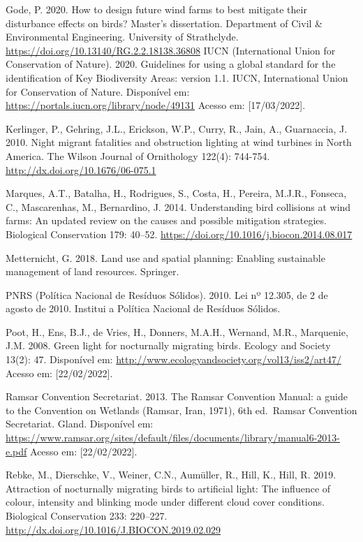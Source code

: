 \documentclass[
  oneside]{scrbook}
\begin{document}
Gode, P. 2020. How to design future wind farms to best mitigate their disturbance effects on birds? Master's dissertation. Department of Civil \& Environmental Engineering. University of Strathclyde. \url{https://doi.org/10.13140/RG.2.2.18138.36808}
IUCN (International Union for Conservation of Nature). 2020. Guidelines for using a global standard for the identification of Key Biodiversity Areas: version 1.1. IUCN, International Union for Conservation of Nature. Disponível em: \url{https://portals.iucn.org/library/node/49131} Acesso em: {[}17/03/2022{]}.

Kerlinger, P., Gehring, J.L., Erickson, W.P., Curry, R., Jain, A., Guarnaccia, J. 2010. Night migrant fatalities and obstruction lighting at wind turbines in North America. The Wilson Journal of Ornithology 122(4): 744-754. \url{http://dx.doi.org/10.1676/06-075.1}

Marques, A.T., Batalha, H., Rodrigues, S., Costa, H., Pereira, M.J.R., Fonseca, C., Mascarenhas, M., Bernardino, J. 2014. Understanding bird collisions at wind farms: An updated review on the causes and possible mitigation strategies. Biological Conservation 179: 40--52. \url{https://doi.org/10.1016/j.biocon.2014.08.017}

Metternicht, G. 2018. Land use and spatial planning: Enabling sustainable management of land resources. Springer.

PNRS (Política Nacional de Resíduos Sólidos). 2010. Lei nº 12.305, de 2 de agosto de 2010. Institui a Política Nacional de Resíduos Sólidos.

Poot, H., Ens, B.J., de Vries, H., Donners, M.A.H., Wernand, M.R., Marquenie, J.M. 2008. Green light for nocturnally migrating birds. Ecology and Society 13(2): 47. Disponível em: \url{http://www.ecologyandsociety.org/vol13/iss2/art47/} Acesso em: {[}22/02/2022{]}.

Ramsar Convention Secretariat. 2013. The Ramsar Convention Manual: a guide to the Convention on Wetlands (Ramsar, Iran, 1971), 6th ed.~Ramsar Convention Secretariat. Gland. Disponível em: \url{https://www.ramsar.org/sites/default/files/documents/library/manual6-2013-e.pdf} Acesso em: {[}22/02/2022{]}.

Rebke, M., Dierschke, V., Weiner, C.N., Aumüller, R., Hill, K., Hill, R. 2019. Attraction of nocturnally migrating birds to artificial light: The influence of colour, intensity and blinking mode under different cloud cover conditions. Biological Conservation 233: 220--227. \url{http://dx.doi.org/10.1016/J.BIOCON.2019.02.029}
\end{document}
